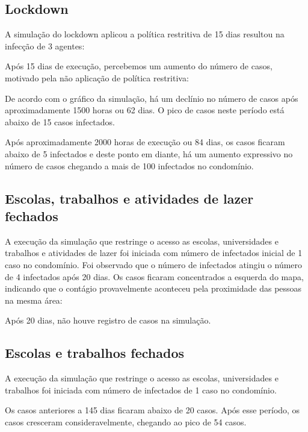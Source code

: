 \subsection{Lockdown}

A simulação do lockdown aplicou a política restritiva de 15 dias resultou na infecção de 3 agentes:


Após 15 dias de execução, percebemos um aumento do número de casos, motivado pela não aplicação de política restritiva:


De acordo com o gráfico da simulação, há um declínio no número de casos após aproximadamente 1500 horas ou 62 dias. O pico de casos neste período está abaixo de 15 casos infectados.

Após aproximadamente 2000 horas de execução ou 84 dias, os casos ficaram abaixo de 5 infectados e deste ponto em diante, há um aumento expressivo no número de casos chegando a mais de 100 infectados no condomínio.

\subsection{Escolas, trabalhos e atividades de lazer fechados}

A execução da simulação que restringe o acesso as escolas, universidades e trabalhos e atividades de lazer foi iniciada com número de infectados inicial de 1 caso no condomínio. Foi observado que o número de infectados atingiu o número de 4 infectados após 20 dias. Os casos ficaram concentrados a esquerda do mapa, indicando que o contágio provavelmente aconteceu pela proximidade das pessoas na mesma área:


Após 20 dias, não houve registro de casos na simulação.

\subsection{Escolas e trabalhos fechados}

A execução da simulação que restringe o acesso as escolas, universidades e trabalhos foi iniciada com número de infectados de 1 caso no condomínio. 



Os casos anteriores a 145 dias ficaram abaixo de 20 casos. Após esse período, os casos cresceram consideravelmente, chegando ao pico de 54 casos.



